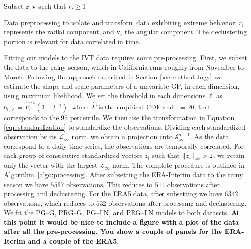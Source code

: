\begin{algorithm}[h]
  Subset $\bm{ r},\bm{ v}$ such that $r_i \geq 1$\\
 \caption{Data preprocessing to isolate and transform data exhibiting extreme behavior.  $r_i$
   represents the radial component, and $\bm{v}_i$ the angular component.  The declustering
   portion is relevant for data correlated in time.\label{algo:processing}}
\end{algorithm}

Fitting our models to the IVT data requires some pre-processing. First, we subset the data to the rainy
  season, which in California runs roughly from November to March.  Following the approach described in Section \ref{sec:methodology} we estimate the shape and scale parameters of a univariate GP, in each dimension, using maximum likelihood. We set the threshold in each dimensions $\ell$ as  $b_{t,\ell} = \hat{F}_{\ell}^{-1}(1 - t^{-1})$, where $\hat{F}$ is the empirical CDF and $t=20$, that corresponds to the $95$ percentile. We then use the transformation in Equation \eqref{eqn:standardization} to standardize the observations.
  Dividing each standardized observation by its $\mathcal{L}_{\infty}$ 
  norm, we obtain a projection onto $\mathcal{S}_{\infty}^{d-1}$. As the data correspond to a daily time series, the observations are temporally correlated.  For each group of consecutive standardized vectors $z_i$ such  that  $\inorm{z_i} > 1$, we retain only the vector 
  with the largest $\mathcal{L}_{\infty}$ norm.  The complete procedure is outlined in
  Algorithm~\ref{algo:processing}.  After subsetting the ERA-Interim data to the rainy season we 
  have $5587$ observations. This reduces to $511$ observations after processing and declustering.  
  For the ERA5 data, after subsetting we have $6342$ observations, which reduces to $532$ observations after 
  processing and declustering.  We fit the PG--G, PRG--G, PG--LN, and PRG--LN models to both datasets.
  {\bf At this point it would be nice to include a figure with a plot of the data after all the pre-processing. You show a couple of panels for the ERA-Iterim and a couple of the ERA5.}

